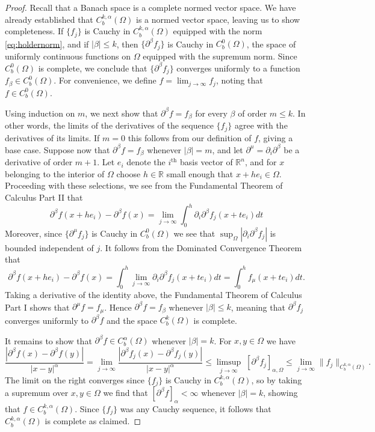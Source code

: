 \documentclass[oneside,hidelinks,indentfirst,10pt]{book}
\begin{document}
\begin{proof} Recall that a Banach space is a complete normed vector space. We have already established that \(C_b^{k,\alpha}(\Omega)\) is a normed vector space, leaving us to show completeness. If \(\{f_j\}\) is Cauchy in \(C_b^{k,\alpha}(\Omega)\) equipped with the norm \eqref{eq:holdernorm}, and if \(|\beta|\leq k\), then \(\{\partial^\beta f_j\}\) is Cauchy in \(C_b^0(\Omega)\), the space of uniformly continuous functions on \(\Omega\) equipped with the supremum norm. Since \(C^0_b(\Omega)\) is complete, we conclude that \(\{\partial^\beta f_j\}\) converges uniformly to a function \(f_\beta\in C_b^0(\Omega)\). For convenience, we define \(f=\displaystyle\lim_{j\rightarrow\infty}f_j\), noting that \(f\in C^0_b(\Omega)\).


Using induction on \(m\), we next show that \(\partial^\beta f=f_\beta\) for every \(\beta\) of order \(m\leq k\). In other words, the limits of the derivatives of the sequence \(\{f_j\}\) agree with the derivatives of its limits.  If \(m=0\) this follows from our definition of \(f\), giving a base case. Suppose now that \(\partial^\beta f=f_\beta\) whenever \(|\beta|=m\), and let \(\partial^\mu =\partial_i\partial^\beta \) be a derivative of order \(m+1\). Let \(e_i\) denote the \(i^\textrm{th}\) basis vector of \(\mathbb{R}^n\), and for \(x\) belonging to the interior of \(\Omega\) choose \(h\in\mathbb{R}\) small enough that \(x+he_i\in\Omega\). Proceeding with these selections, we see from the Fundamental Theorem of Calculus Part II that
\[
    \partial^\beta f(x+he_i)-\partial^\beta f(x)=\lim_{j\rightarrow\infty}\int_0^h\partial_{i}\partial^\beta f_j(x+te_i)dt
\]
Moreover, since \(\{\partial^\mu f_j\}\) is Cauchy in \(C^{0}_b(\Omega)\) we see that \(\sup_\Omega|\partial_i\partial^\beta f_j|\) is bounded independent of \(j\). It follows from the Dominated Convergence Theorem that
\[
    \partial^\beta f(x+he_i)-\partial^\beta f(x)=\int_0^h\lim_{j\rightarrow\infty}\partial_{i}\partial^\beta f_j(x+te_i)dt=\int_0^h f_\mu(x+te_i)dt.
\]
Taking a derivative of the identity above, the Fundamental Theorem of Calculus Part I shows that \(\partial^\mu f=f_\mu\). Hence \(\partial^\beta f=f_\beta\) whenever \(|\beta|\leq k\), meaning that \(\partial^\beta f_j\) converges uniformly to \(\partial^\beta f\) and the space \(C^k_b(\Omega)\) is complete.


It remains to show that \(\partial^\beta f\in C^\alpha_b(\Omega)\) whenever \(|\beta|=k\). For \(x,y\in\Omega\) we have
\[
        \frac{|\partial^\beta f(x)-\partial^\beta f(y)|}{|x-y|^\alpha}=\lim_{j\rightarrow\infty}\frac{|\partial^\beta f_j(x)-\partial^\beta f_j(y)|}{|x-y|^\alpha}\leq \limsup_{j\rightarrow\infty}\;[\partial^\beta f_j]_{\alpha,\Omega} \leq \lim_{j\rightarrow\infty}\|f_j\|_{C_b^{k,\alpha}(\Omega)}.
\]
The limit on the right converges since \(\{f_j\}\) is Cauchy in \(C_b^{k,\alpha}(\Omega)\), so by taking a supremum over \(x,y\in\Omega\) we find that \([\partial^\beta f]_\alpha<\infty\) whenever \(|\beta|=k\), showing that \(f\in C_b^{k,\alpha}(\Omega)\). Since \(\{f_j\}\) was any Cauchy sequence, it follows that \(C_b^{k,\alpha}(\Omega)\) is complete as claimed.
\end{proof}
\end{document}

